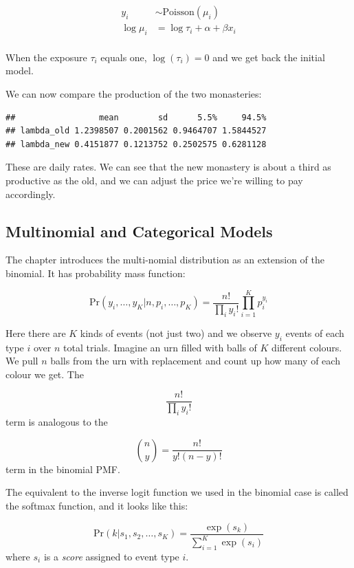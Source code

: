 \documentclass[
]{book}
\begin{document}
\[
\begin{aligned}
y_i &\sim \text{Poisson}(\mu_i) \\
\log \mu_i &= \log \tau_i + \alpha + \beta x_i \\
\end{aligned}
\]

When the exposure \(\tau_i\) equals one, \(\log(\tau_i) = 0\) and we get back the initial model.

We can now compare the production of the two monasteries:

\begin{verbatim}
##                 mean        sd      5.5%     94.5%
## lambda_old 1.2398507 0.2001562 0.9464707 1.5844527
## lambda_new 0.4151877 0.1213752 0.2502575 0.6281128
\end{verbatim}

These are daily rates. We can see that the new monastery is about a third as productive as the old, and we can adjust the price we're willing to pay accordingly.

\hypertarget{multinomial-and-categorical-models}{%
\subsection*{Multinomial and Categorical Models}\label{multinomial-and-categorical-models}}

The chapter introduces the multi-nomial distribution as an extension of the binomial. It has probability mass function:

\[
\text{Pr}(y_i, \dots , y_K | n, p_i, \dots , p_K) = \frac{n!}{\prod_i y_i!} \prod^K_{i=1}p_i^{y_i}
\]

Here there are \(K\) kinds of events (not just two) and we observe \(y_i\) events of each type \(i\) over \(n\) total trials. Imagine an urn filled with balls of \(K\) different colours. We pull \(n\) balls from the urn with replacement and count up how many of each colour we get. The

\[
\frac{n!}{\prod_i y_i!}
\]
term is analogous to the

\[
{n \choose y} = \frac{n!}{y! (n-y)!}
\]
term in the binomial PMF.

The equivalent to the inverse logit function we used in the binomial case is called the softmax function, and it looks like this:

\[
\text{Pr}(k| s_1, s_2, \dots, s_K) = \frac{\exp(s_k)}{\sum^K_{i=1} \exp(s_i)}
\]
where \(s_i\) is a \emph{score} assigned to event type \(i\).
\end{document}
